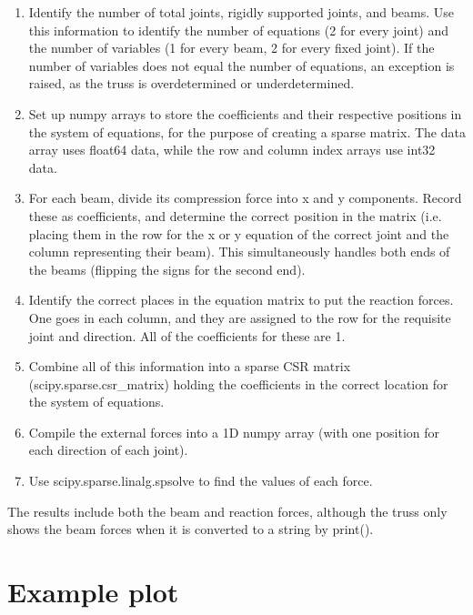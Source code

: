 \documentclass{article}
\begin{document}
\begin{enumerate}

\item Identify the number of total joints, rigidly supported joints, and
  beams. Use this information to identify the number of equations (2 for every
  joint) and the number of variables (1 for every beam, 2 for every fixed
  joint). If the number of variables does not equal the number of equations,
  an exception is raised, as the truss is overdetermined or underdetermined.

\item Set up numpy arrays to store the coefficients and their respective
  positions in the system of equations, for the purpose of creating a sparse
  matrix. The data array uses float64 data, while the row and column index
  arrays use int32 data.

\item For each beam, divide its compression force into x and y components.
  Record these as coefficients, and determine the correct position in the matrix
  (i.e. placing them in the row for the x or y equation of the correct joint
  and the column representing their beam). This simultaneously handles both
  ends of the beams (flipping the signs for the second end).

\item Identify the correct places in the equation matrix to put the reaction
  forces. One goes in each column, and they are assigned to the row for the
  requisite joint and direction. All of the coefficients for these are 1.

\item Combine all of this information into a sparse CSR matrix
  (scipy.sparse.csr\_matrix) holding the coefficients in the correct location
  for the system of equations.

\item Compile the external forces into a 1D numpy array (with one position for
  each direction of each joint).

\item Use scipy.sparse.linalg.spsolve to find the values of each force.

\end{enumerate}

The results include both the beam and reaction forces, although the truss
only shows the beam forces when it is converted to a string by print().

\section{Example plot}
\end{document}
